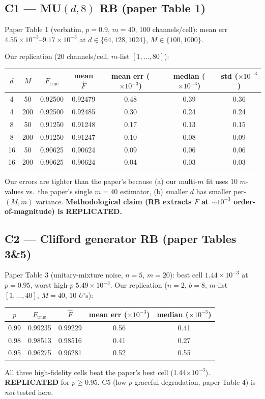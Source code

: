 \documentclass[11pt]{article}
\begin{document}
\subsection{C1 --- MU$(d,8)$ RB (paper Table 1)}
Paper Table 1 (verbatim, $p=0.9$, $m=40$, 100 channels/cell): mean err $4.55\times 10^{-3}$--$9.17\times 10^{-3}$ at $d\in\{64,128,1024\}$, $M\in\{100,1000\}$.

Our replication (20 channels/cell, $m$-list $[1,\dots,80]$):
\begin{center}
\small
\begin{tabular}{ccccccc}
\toprule
$d$ & $M$ & $F_{\text{true}}$ & mean $\hat F$ & mean err ($\times 10^{-3}$) & median ($\times 10^{-3}$) & std ($\times 10^{-3}$) \\
\midrule
4  & 50  & 0.92500 & 0.92479 & 0.48 & 0.39 & 0.36 \\
4  & 200 & 0.92500 & 0.92485 & 0.30 & 0.24 & 0.24 \\
8  & 50  & 0.91250 & 0.91248 & 0.17 & 0.13 & 0.15 \\
8  & 200 & 0.91250 & 0.91247 & 0.10 & 0.08 & 0.09 \\
16 & 50  & 0.90625 & 0.90624 & 0.09 & 0.06 & 0.06 \\
16 & 200 & 0.90625 & 0.90624 & 0.04 & 0.03 & 0.03 \\
\bottomrule
\end{tabular}
\end{center}
Our errors are tighter than the paper's because (a) our multi-$m$ fit uses 10 $m$-values vs.\ the paper's single $m=40$ estimator, (b) smaller $d$ has smaller per-$(M,m)$ variance. \textbf{Methodological claim (RB extracts $F$ at $\sim\!10^{-3}$ order-of-magnitude) is REPLICATED.}

\subsection{C2 --- Clifford generator RB (paper Tables 3\&5)}
Paper Table 3 (unitary-mixture noise, $n=5$, $m=20$): best cell $1.44\times 10^{-3}$ at $p=0.95$, worst high-$p$ $5.49\times 10^{-3}$. Our replication ($n=2$, $b=8$, $m$-list $[1,\dots,40]$, $M=40$, 10 $U$'s):
\begin{center}
\small
\begin{tabular}{ccccc}
\toprule
$p$ & $F_{\text{true}}$ & $\hat F$ & mean err ($\times 10^{-3}$) & median ($\times 10^{-3}$) \\
\midrule
0.99 & 0.99235 & 0.99229 & 0.56 & 0.41 \\
0.98 & 0.98513 & 0.98516 & 0.41 & 0.27 \\
0.95 & 0.96275 & 0.96281 & 0.52 & 0.55 \\
\bottomrule
\end{tabular}
\end{center}
All three high-fidelity cells beat the paper's best cell (1.44$\times 10^{-3}$). \textbf{REPLICATED} for $p\ge 0.95$. C5 (low-$p$ graceful degradation, paper Table 4) is \emph{not} tested here.
\end{document}
